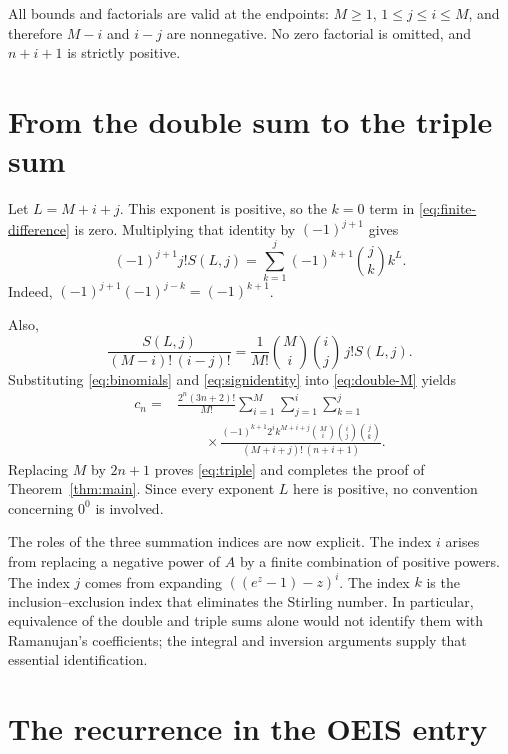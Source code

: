 \documentclass[11pt,letterpaper]{article}
\numberwithin{equation}{section}
\theoremstyle{remark}
\begin{document}
All bounds and factorials are valid at the endpoints: $M\geq1$,
$1\leq j\leq i\leq M$, and therefore $M-i$ and $i-j$ are nonnegative.
No zero factorial is omitted, and $n+i+1$ is strictly positive.

\section{From the double sum to the triple sum}
\label{sec:triple}

Let $L=M+i+j$. This exponent is positive, so the $k=0$ term in
\eqref{eq:finite-difference} is zero. Multiplying that identity by
$(-1)^{j+1}$ gives
\begin{equation}
 (-1)^{j+1}j!S(L,j)
 =\sum_{k=1}^{j}(-1)^{k+1}\binom jk k^L.
 \label{eq:signidentity}
\end{equation}
Indeed, $(-1)^{j+1}(-1)^{j-k}=(-1)^{k+1}$.

Also,
\begin{equation}
 \frac{S(L,j)}{(M-i)!\,(i-j)!}
 =\frac1{M!}\binom Mi\binom ij\,j!S(L,j).
 \label{eq:binomials}
\end{equation}
Substituting \eqref{eq:binomials} and \eqref{eq:signidentity} into
\eqref{eq:double-M} yields
\begin{equation}
\begin{split}
 c_n={}&\frac{2^n(3n+2)!}{M!}
 \sum_{i=1}^{M}\sum_{j=1}^{i}\sum_{k=1}^{j}\\[-2pt]
 &\qquad\times
 \frac{(-1)^{k+1}2^i k^{M+i+j}
       \binom Mi\binom ij\binom jk}
      {(M+i+j)!\,(n+i+1)}.
\end{split}
\label{eq:triple-M}
\end{equation}
Replacing $M$ by $2n+1$ proves \eqref{eq:triple} and completes the proof of
Theorem~\ref{thm:main}. Since every exponent $L$ here is positive, no
convention concerning $0^0$ is involved.

The roles of the three summation indices are now explicit. The index $i$
arises from replacing a negative power of $A$ by a finite combination of
positive powers. The index $j$ comes from expanding
$((e^z-1)-z)^i$. The index $k$ is the inclusion--exclusion index that
eliminates the Stirling number. In particular, equivalence of the double
and triple sums alone would not identify them with Ramanujan's
coefficients; the integral and inversion arguments supply that essential
identification.

\section{The recurrence in the OEIS entry}
\label{sec:recurrence}
\end{document}
